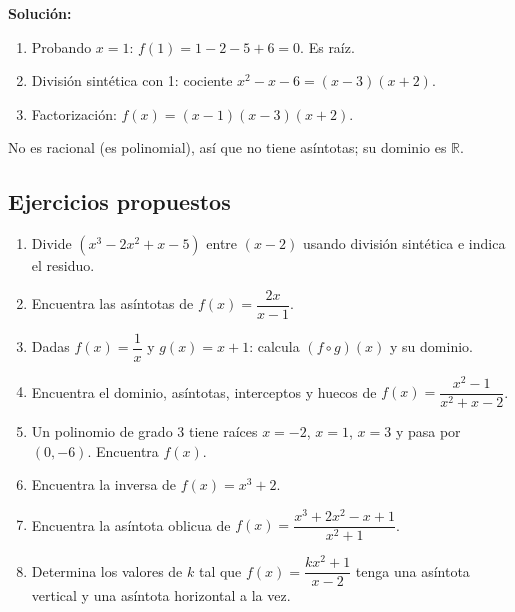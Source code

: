 \documentclass[12pt, letterpaper]{article}
\begin{document}
\begin{cuadrosolucion}
  \textbf{Solución:}
  \begin{enumerate}
    \item Probando $x = 1$: $f(1) = 1 - 2 - 5 + 6 = 0$. Es raíz.
    \item División sintética con 1: cociente $x^2 - x - 6 = (x - 3)(x + 2)$.
    \item Factorización: $f(x) = (x - 1)(x - 3)(x + 2)$.
  \end{enumerate}
  No es racional (es polinomial), así que no tiene asíntotas; su dominio es $\mathbb{R}$.
\end{cuadrosolucion}

\subsection{Ejercicios propuestos}

\begin{enumerate}[resume=ejercicios, leftmargin=*]
  \item \facil{} Divide $(x^3 - 2x^2 + x - 5)$ entre $(x - 2)$ usando división sintética e indica el residuo.

  \item \facil{} Encuentra las asíntotas de $f(x) = \dfrac{2x}{x - 1}$.

  \item \facil{} Dadas $f(x) = \dfrac{1}{x}$ y $g(x) = x + 1$: calcula $(f \circ g)(x)$ y su dominio.

  \item \medio{} Encuentra el dominio, asíntotas, interceptos y huecos de $f(x) = \dfrac{x^2 - 1}{x^2 + x - 2}$.

  \item \medio{} Un polinomio de grado 3 tiene raíces $x = -2$, $x = 1$, $x = 3$ y pasa por $(0, -6)$. Encuentra $f(x)$.

  \item \medio{} Encuentra la inversa de $f(x) = x^3 + 2$.

  \item \dificil{} Encuentra la asíntota oblicua de $f(x) = \dfrac{x^3 + 2x^2 - x + 1}{x^2 + 1}$.

  \item \dificil{} Determina los valores de $k$ tal que $f(x) = \dfrac{kx^2 + 1}{x - 2}$ tenga una asíntota vertical y una asíntota horizontal a la vez.
\end{enumerate}

\newpage
\end{document}

